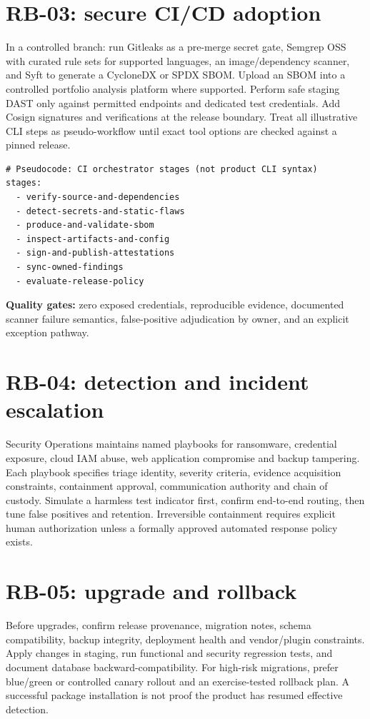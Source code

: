 \documentclass[11pt,oneside]{report}
\begin{document}
\section{RB-03: secure CI/CD adoption}
In a controlled branch: run Gitleaks as a pre-merge secret gate, Semgrep OSS with curated rule sets for supported languages, an image/dependency scanner, and Syft to generate a CycloneDX or SPDX SBOM. Upload an SBOM into a controlled portfolio analysis platform where supported. Perform safe staging DAST only against permitted endpoints and dedicated test credentials. Add Cosign signatures and verifications at the release boundary. Treat all illustrative CLI steps as pseudo-workflow until exact tool options are checked against a pinned release.
\begin{verbatim}
# Pseudocode: CI orchestrator stages (not product CLI syntax)
stages:
  - verify-source-and-dependencies
  - detect-secrets-and-static-flaws
  - produce-and-validate-sbom
  - inspect-artifacts-and-config
  - sign-and-publish-attestations
  - sync-owned-findings
  - evaluate-release-policy
\end{verbatim}
\textbf{Quality gates:} zero exposed credentials, reproducible evidence, documented scanner failure semantics, false-positive adjudication by owner, and an explicit exception pathway.

\section{RB-04: detection and incident escalation}
Security Operations maintains named playbooks for ransomware, credential exposure, cloud IAM abuse, web application compromise and backup tampering. Each playbook specifies triage identity, severity criteria, evidence acquisition constraints, containment approval, communication authority and chain of custody. Simulate a harmless test indicator first, confirm end-to-end routing, then tune false positives and retention. Irreversible containment requires explicit human authorization unless a formally approved automated response policy exists.

\section{RB-05: upgrade and rollback}
Before upgrades, confirm release provenance, migration notes, schema compatibility, backup integrity, deployment health and vendor/plugin constraints. Apply changes in staging, run functional and security regression tests, and document database backward-compatibility. For high-risk migrations, prefer blue/green or controlled canary rollout and an exercise-tested rollback plan. A successful package installation is not proof the product has resumed effective detection.
\end{document}
